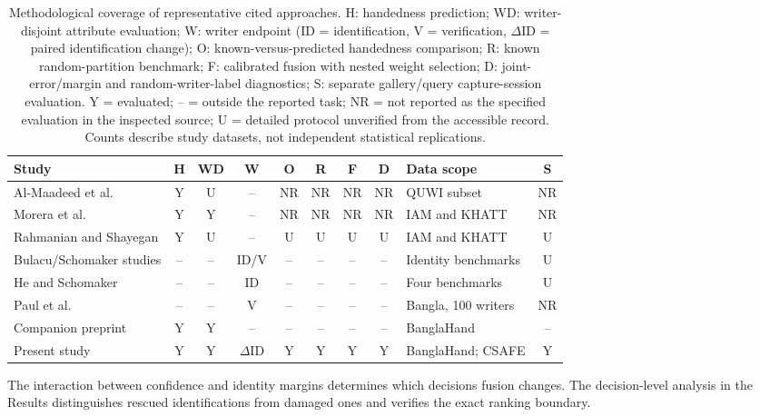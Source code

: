 \documentclass[ASNA,twocolumn]{USG}
\begin{document}
\begin{table}[!t]
\caption{Methodological coverage of representative cited approaches. H: handedness prediction; WD: writer-disjoint attribute evaluation; W: writer endpoint (ID = identification, V = verification, $\Delta$ID = paired identification change); O: known-versus-predicted handedness comparison; R: known random-partition benchmark; F: calibrated fusion with nested weight selection; D: joint-error/margin and random-writer-label diagnostics; S: separate gallery/query capture-session evaluation. Y = evaluated; -- = outside the reported task; NR = not reported as the specified evaluation in the inspected source; U = detailed protocol unverified from the accessible record. Counts describe study datasets, not independent statistical replications.}\label{tab:positioning}
\centering\footnotesize
\setlength{\tabcolsep}{4pt}
\begin{tabularx}{\textwidth}{@{}p{}cccccccXc@{}}\toprule
Study & H & WD & W & O & R & F & D & Data scope & S\\\midrule
Al-Maadeed et al.\ \cite{almaadeed2016handedness} & Y & U & -- & NR & NR & NR & NR & QUWI subset & NR\\
Morera et al.\ \cite{morera2018handedness} & Y & Y & -- & NR & NR & NR & NR & IAM and KHATT & NR\\
Rahmanian and Shayegan \cite{rahmanian2021handedness} & Y & U & -- & U & U & U & U & IAM and KHATT & U\\
Bulacu/Schomaker studies \cite{bulacu2007text,schomaker2007codebooks} & -- & -- & ID/V & -- & -- & -- & -- & Identity benchmarks & U\\
He and Schomaker \cite{he2020fragnet} & -- & -- & ID & -- & -- & -- & -- & Four benchmarks & U\\
Paul et al.\ \cite{paul2024bangla} & -- & -- & V & -- & -- & -- & -- & Bangla, 100 writers & NR\\
Companion preprint \cite{prappo2026handedness} & Y & Y & -- & -- & -- & -- & -- & BanglaHand & --\\
Present study & Y & Y & $\Delta$ID & Y & Y & Y & Y & BanglaHand; CSAFE & Y\\\bottomrule
\end{tabularx}
\end{table}

The interaction between confidence and identity margins determines which decisions fusion changes. The decision-level analysis in the Results distinguishes rescued identifications from damaged ones and verifies the exact ranking boundary.
\end{document}
